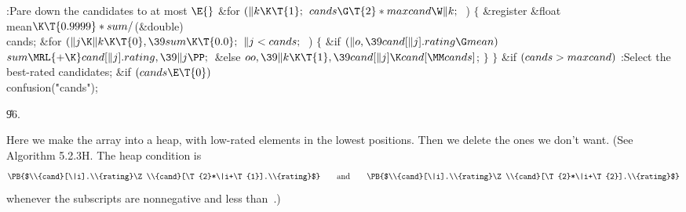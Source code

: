 \Y\B\4:Pare down the candidates to at most \X${}\E{}$\6
\&{for} ${}(\|k\K\T{1};{}$ ${}\\{cands}\G\T{2}*\\{maxcand}\W\|k;{}$ \,)\5
${}\{{}$\1\6
\&{register} \&{float} \\{mean}${}\K\T{0.9999}*\\{sum}/{}$(\&{double}) %
\\{cands};\7
\&{for} ${}(\|j\K\|k\K\T{0},\39\\{sum}\K\T{0.0};{}$ ${}\|j<\\{cands};{}$ \,)\5
${}\{{}$\1\6
\&{if} ${}(\|o,\39\\{cand}[\|j].\\{rating}\G\\{mean}){}$\1\5
${}\\{sum}\MRL{+{\K}}\\{cand}[\|j].\\{rating},\39\|j\PP;{}$\2\6
\&{else}\1\5
${}\\{oo},\39\|k\K\T{1},\39\\{cand}[\|j]\K\\{cand}[\MM\\{cands}]{}$;\2\6
\4${}\}{}$\2\6
\4${}\}{}$\2\6
\&{if} ${}(\\{cands}>\\{maxcand}){}$\1\5
:Select the  best-rated candidates\X;\2\6
\&{if} ${}(\\{cands}\E\T{0}){}$\1\5
\\{confusion}(\.{"cands"});\2\par
\U96.\fi

Here we make the  array into a heap, with low-rated
elements
in the lowest positions. Then we delete the ones we don't want.
(See Algorithm 5.2.3H. The heap condition is
$$\hbox{\PB{$\\{cand}[\|i].\\{rating}\Z\\{cand}[\T{2}*\|i+\T{1}].\\{rating}$}%
\qquad
and\qquad \PB{$\\{cand}[\|i].\\{rating}\Z\\{cand}[\T{2}*\|i+\T{2}].%
\\{rating}$}}$$
whenever the subscripts are nonnegative and less than~.)

